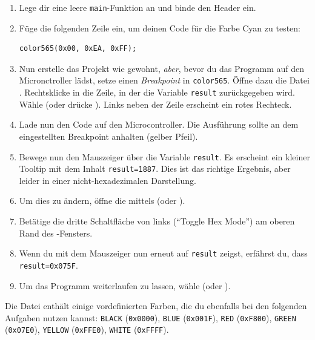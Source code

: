 \begin{enumerate}
\item 
Lege dir eine leere \lstinline|main|-Funktion an und binde den Header  ein.
\item 
Füge die folgenden Zeile ein, um deinen Code für die Farbe Cyan zu testen:
\begin{lstlisting}
color565(0x00, 0xEA, 0xFF);
\end{lstlisting}
\item 
Nun erstelle das Projekt wie gewohnt, \emph{aber}, bevor du das Programm auf den Micronctroller lädst, setze einen \emph{Breakpoint} in \lstinline|color565|.
Öffne dazu die Datei .
Rechtsklicke in die Zeile, in der die Variable \lstinline|result| zurückgegeben wird.
Wähle  (oder drücke ).
Links neben der Zeile erscheint ein rotes Rechteck.
\item 
Lade nun den Code auf den Microcontroller.
Die Ausführung sollte an dem eingestellten Breakpoint anhalten (gelber Pfeil).
\item 
Bewege nun den Mauszeiger über die Variable \lstinline|result|.
Es erscheint ein kleiner Tooltip mit dem Inhalt \lstinline|result=1887|.
Dies ist das richtige Ergebnis, aber leider in einer nicht-hexadezimalen Darstellung.
\item 
Um dies zu ändern, öffne die  mittels  (oder ).
\item 
Betätige die dritte Schaltfläche von links (\enquote{Toggle Hex Mode}) am oberen Rand des -Fensters.
\item 
Wenn du mit dem Mauszeiger nun erneut auf \lstinline|result| zeigst, erfährst du, dass \lstinline|result=0x075F|.
\item 
Um das Programm weiterlaufen zu lassen, wähle  (oder ).
\end{enumerate}
%
Die Datei  enthält einige vordefinierten Farben, die du ebenfalls bei den folgenden Aufgaben nutzen kannst: \lstinline|BLACK| (\lstinline|0x0000|), \lstinline|BLUE| (\lstinline|0x001F|), \lstinline|RED| (\lstinline|0xF800|), \lstinline|GREEN| (\lstinline|0x07E0|), \lstinline|YELLOW| (\lstinline|0xFFE0|), \lstinline|WHITE| (\lstinline|0xFFFF|).

